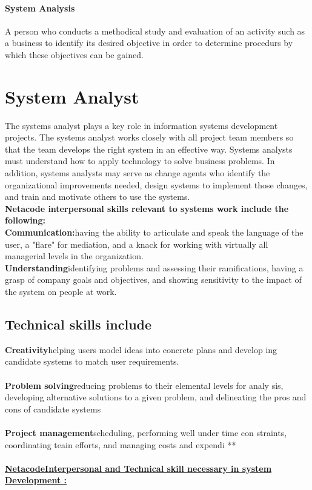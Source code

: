 \documentclass[a4paper,12pt]{report}
\begin{document}
\paragraph{System Analysis} 
A person who conducts a methodical study and evaluation of an activity such as a business to identify its desired objective in order to determine procedurs by which these objectives can be gained.
\section{System Analyst}
The systems analyst plays a key role in information systems development projects. The systems analyst works closely with all project team members so that the team develops the right system in an effective way. Systems analysts must understand how to apply technology to solve business problems. In addition, systems analysts may serve as change agents who identify the organizational improvements needed, design systems to implement those changes, and train and motivate others to use the systems.\\
\textbf{Netacode interpersonal skills relevant to systems work include the following: }\\
\textbf{Communication:}having the ability to articulate and speak the language of the user, a "flare" for mediation, and a knack for working with virtually all managerial levels in the organization.  \\
\textbf{Understanding}identifying problems and assessing their ramifications, having a grasp of company goals and objectives, and showing sensitivity to the impact of the system on people at work.
\subsection{Technical skills include}
\textbf{Creativity}helping users model ideas into concrete plans and develop ing candidate systems to match user requirements.\\ \\
\textbf{Problem solving}reducing problems to their elemental levels for analy sis, developing alternative solutions to a given problem, and delineating the pros and cons of candidate systems\\ \\
\textbf{Project management}scheduling, performing well under time con straints, coordinating teain efforts, and managing costs and expendi **\\ \\
\underline{\textbf{NetacodeInterpersonal and Technical skill necessary in system Development :}}
\end{document}
